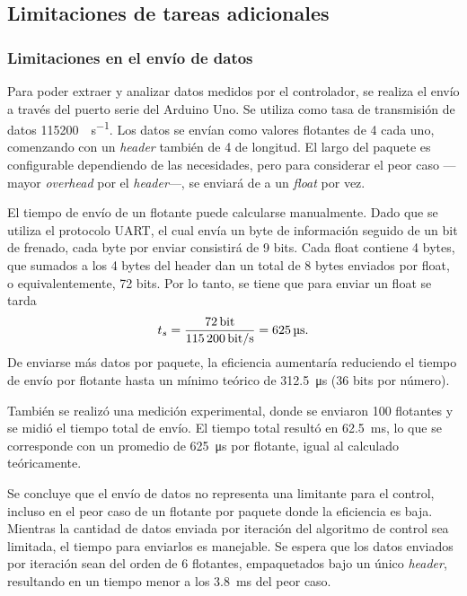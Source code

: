 \subsection{Limitaciones de tareas adicionales}

\subsubsection{Limitaciones en el envío de datos}

Para poder extraer y analizar datos medidos por el controlador, se realiza el envío a través del puerto serie del Arduino Uno. Se utiliza como tasa de transmisión de datos \qty{115200}{\bit\per\s}. Los datos se envían como valores flotantes de \qty{4}{\byte} cada uno, comenzando con un \emph{header} también de \qty{4}{\byte} de longitud. El largo del paquete es configurable dependiendo de las necesidades, pero para considerar el peor caso ---mayor \emph{overhead} por el \emph{header}---, se enviará de a un \emph{float} por vez.

El tiempo de envío de un flotante puede calcularse manualmente. Dado que se utiliza el protocolo UART, el cual envía un byte de información seguido de un bit de frenado, cada byte por enviar consistirá de 9 bits. Cada float contiene 4 bytes, que sumados a los 4 bytes del header dan un total de 8 bytes enviados por float, o equivalentemente, 72 bits. Por lo tanto, se tiene que para enviar un float se tarda
$$t_s = \frac{\qty{72}{\bit}}{\qty{115200}{\bit\per\s}} = \qty{625}{\us}.$$
De enviarse más datos por paquete, la eficiencia aumentaría reduciendo el tiempo de envío por flotante hasta un mínimo teórico de \qty{312.5}{\us} (36 bits por número).

También se realizó una medición experimental, donde se enviaron 100 flotantes y se midió el tiempo total de envío. El tiempo total resultó en \qty{62.5}{\ms}, lo que se corresponde con un promedio de \qty{625}{\us} por flotante, igual al calculado teóricamente.

Se concluye que el envío de datos no representa una limitante para el control, incluso en el peor caso de un flotante por paquete donde la eficiencia es baja. Mientras la cantidad de datos enviada por iteración del algoritmo de control sea limitada, el tiempo para enviarlos es manejable. Se espera que los datos enviados por iteración sean del orden de 6 flotantes, empaquetados bajo un único \emph{header}, resultando en un tiempo menor a los \qty{3.8}{\ms} del peor caso.

